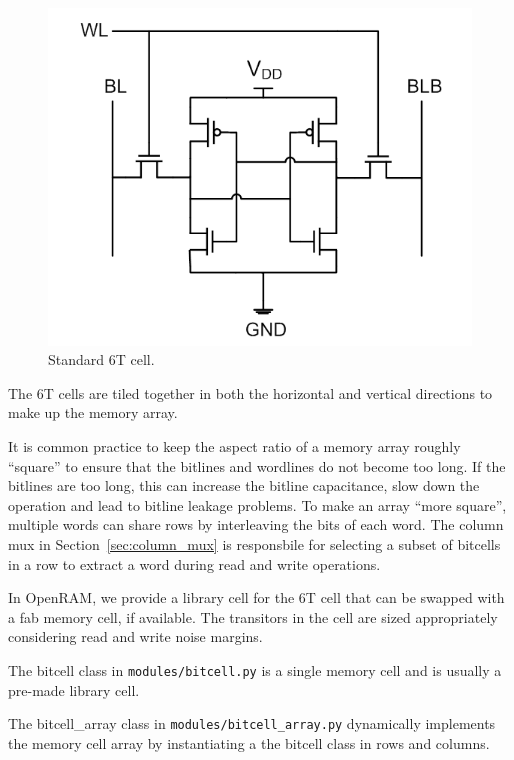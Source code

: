 \begin{figure}[h!]
\centering
\includegraphics[scale=.9]{figs/cell_6t_schem.pdf}
\caption{Standard 6T cell.}
\label{fig:6t_cell}
\end{figure}

The 6T cells are tiled together in both the horizontal and vertical
directions to make up the memory array.  

It is common practice to keep the aspect ratio of a memory array
roughly ``square'' to ensure that the bitlines and wordlines do not
become too long. If the bitlines are too long, this can increase the
bitline capacitance, slow down the operation and lead to bitline
leakage problems.  To make an array ``more square'', multiple words
can share rows by interleaving the bits of each word. The column mux
in Section~\ref{sec:column_mux} is responsbile for selecting a subset
of bitcells in a row to extract a word during read and write
operations.

In OpenRAM, we provide a library cell for the 6T cell that can be
swapped with a fab memory cell, if available. The transitors in the
cell are sized appropriately considering read and write noise margins.

The bitcell class in \verb|modules/bitcell.py| is a single
memory cell and is usually a pre-made library cell.

The bitcell\_array class in \verb|modules/bitcell_array.py| dynamically
implements the memory cell array by instantiating a the bitcell class
in rows and columns.

